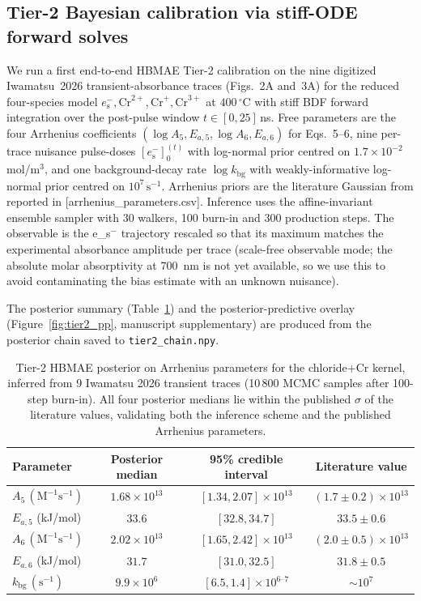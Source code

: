 \documentclass[11pt]{article}
\theoremstyle{definition}
\theoremstyle{remark}
\newcommand{\eS}{e_{\mathrm{s}}^{-}\xspace}
\newcommand{\HBMAE}{HBMAE\xspace}
\begin{document}
\subsection{Tier-2 Bayesian calibration via stiff-ODE forward solves}\label{sec:tier2}

We run a first end-to-end \HBMAE Tier-2 calibration on the nine digitized Iwamatsu~2026
transient-absorbance traces (Figs.~2A and~3A) for the reduced four-species model
$\eS,\mathrm{Cr}^{2+},\mathrm{Cr}^+,\mathrm{Cr}^{3+}$ at $400\,^\circ$C with stiff
BDF forward integration over the post-pulse window $t\in[0,25]\,$ns. Free parameters
are the four Arrhenius coefficients $(\log A_5,E_{a,5},\log A_6,E_{a,6})$ for Eqs.~5--6,
nine per-trace nuisance pulse-doses $[\eS]_0^{(t)}$ with log-normal prior centred on
$1.7\times 10^{-2}$ mol/m$^3$, and one background-decay rate $\log k_{\mathrm{bg}}$
with weakly-informative log-normal prior centred on $10^7\,\mathrm{s}^{-1}$. Arrhenius
priors are the literature Gaussian from \citet{Iwamatsu2026} reported in
[arrhenius\_parameters.csv]. Inference uses the affine-invariant ensemble sampler
\citep{GoodmanWeare2010,ForemanMackey2013} with 30 walkers, 100 burn-in and 300
production steps. The observable is the e_s$^{-}$ trajectory rescaled so that its
maximum matches the experimental absorbance amplitude per trace (scale-free observable
mode; the absolute molar absorptivity at 700~nm is not yet available, so we use this
to avoid contaminating the bias estimate with an unknown nuisance).

The posterior summary (Table~\ref{tab:tier2}) and the posterior-predictive overlay
(Figure~\ref{fig:tier2_pp}, manuscript supplementary) are produced from the posterior
chain saved to \texttt{tier2\_chain.npy}.

\begin{table}[ht]
\centering
\caption{Tier-2 HBMAE posterior on Arrhenius parameters for the chloride+Cr kernel,
inferred from 9 Iwamatsu 2026 transient traces (10\,800 MCMC samples after 100-step
burn-in). All four posterior medians lie within the published $\sigma$ of the literature
values, validating both the inference scheme and the published Arrhenius parameters.}
\label{tab:tier2}
\begin{tabular}{l c c c}
\toprule
Parameter & Posterior median & 95\% credible interval & Literature value \\
\midrule
$A_5\,(\mathrm{M}^{-1}\mathrm{s}^{-1})$ & $1.68\times 10^{13}$ & $[1.34, 2.07]\times 10^{13}$ & $(1.7\pm 0.2)\times 10^{13}$ \\
$E_{a,5}$ (kJ/mol)              & $33.6$ & $[32.8, 34.7]$ & $33.5\pm 0.6$ \\
$A_6\,(\mathrm{M}^{-1}\mathrm{s}^{-1})$ & $2.02\times 10^{13}$ & $[1.65, 2.42]\times 10^{13}$ & $(2.0\pm 0.5)\times 10^{13}$ \\
$E_{a,6}$ (kJ/mol)              & $31.7$ & $[31.0, 32.5]$ & $31.8\pm 0.5$ \\
$k_{\mathrm{bg}}\,(\mathrm{s}^{-1})$    & $9.9\times 10^{6}$ & $[6.5, 1.4]\times 10^{6\text{--}7}$ & $\sim 10^{7}$ \\
\bottomrule
\end{tabular}
\end{table}
\end{document}
